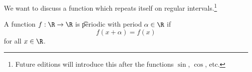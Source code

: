

We want to discuss a function which repeats itself on regular intervals.\footnote{Future editions will introduce this after the functions $\sin$, $\cos$, etc.}


A function $f: \R \to \R$ is \t{periodic with period} $\alpha \in \R$ if
\[
  f(x + \alpha) = f(x)
\]
for all $x \in \R$.

\blankpage
